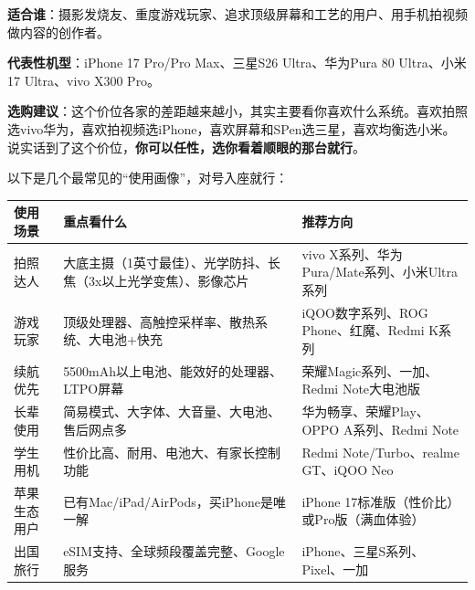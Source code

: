 
\textbf{适合谁}：摄影发烧友、重度游戏玩家、追求顶级屏幕和工艺的用户、用手机拍视频做内容的创作者。

\textbf{代表性机型}：iPhone 17 Pro/Pro Max、三星S26 Ultra、华为Pura 80 Ultra、小米17 Ultra、vivo X300 Pro。

\textbf{选购建议}：这个价位各家的差距越来越小，其实主要看你喜欢什么系统。喜欢拍照选vivo华为，喜欢拍视频选iPhone，喜欢屏幕和SPen选三星，喜欢均衡选小米。说实话到了这个价位，\textbf{你可以任性，选你看着顺眼的那台就行}。


以下是几个最常见的“使用画像”，对号入座就行：

\begin{center}
\begin{tabularx}{\linewidth}{|X|X|X|}
\hline
\textbf{使用场景} & \textbf{重点看什么} & \textbf{推荐方向} \tabularnewline
\hline
拍照达人 & 大底主摄（1英寸最佳）、光学防抖、长焦（3x以上光学变焦）、影像芯片 & vivo X系列、华为Pura/Mate系列、小米Ultra系列 \tabularnewline
游戏玩家 & 顶级处理器、高触控采样率、散热系统、大电池+快充 & iQOO数字系列、ROG Phone、红魔、Redmi K系列 \tabularnewline
续航优先 & 5500mAh以上电池、能效好的处理器、LTPO屏幕 & 荣耀Magic系列、一加、Redmi Note大电池版 \tabularnewline
长辈使用 & 简易模式、大字体、大音量、大电池、售后网点多 & 华为畅享、荣耀Play、OPPO A系列、Redmi Note \tabularnewline
学生用机 & 性价比高、耐用、电池大、有家长控制功能 & Redmi Note/Turbo、realme GT、iQOO Neo \tabularnewline
苹果生态用户 & 已有Mac/iPad/AirPods，买iPhone是唯一解 & iPhone 17标准版（性价比）或Pro版（满血体验） \tabularnewline
出国旅行 & eSIM支持、全球频段覆盖完整、Google服务 & iPhone、三星S系列、Pixel、一加 \tabularnewline
\hline
\end{tabularx}
\end{center}


